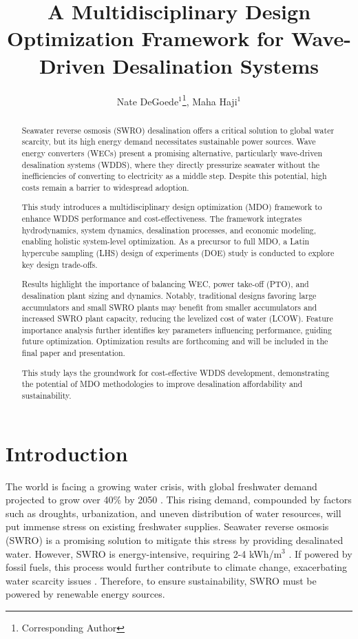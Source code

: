 \documentclass[twocolumn,10pt]{asme2e}
\title{ \vspace{-10 mm} A Multidisciplinary Design Optimization Framework for Wave-Driven Desalination Systems}
\author{Nate DeGoede$^1$\thanks{Corresponding Author}, Maha Haji$^1$
    \affiliation{
	$^1$Sibley School of Mechanical and Aerospace Engineering\\
	Cornell University\\
	Ithaca, New York 14853\\
    Email: \{njd76, maha\}@cornell.edu 
    }
}
\begin{document}
\maketitle

\setlength{\abovedisplayskip}{10pt}
\setlength{\belowdisplayskip}{10pt}

\begin{abstract}

Seawater reverse osmosis (SWRO) desalination offers a critical solution to global water scarcity, but its high energy demand necessitates sustainable power sources. Wave energy converters (WECs) present a promising alternative, particularly wave-driven desalination systems (WDDS), where they directly pressurize seawater without the inefficiencies of converting to electricity as a middle step. Despite this potential, high costs remain a barrier to widespread adoption. 

This study introduces a multidisciplinary design optimization (MDO) framework to enhance WDDS performance and cost-effectiveness. The framework integrates hydrodynamics, system dynamics, desalination processes, and economic modeling, enabling holistic system-level optimization.  As a precursor to full MDO, a Latin hypercube sampling (LHS) design of experiments (DOE) study is conducted to explore key design trade-offs. 

Results highlight the importance of balancing WEC, power take-off (PTO), and desalination plant sizing and dynamics. Notably, traditional designs favoring large accumulators and small SWRO plants may benefit from smaller accumulators and increased SWRO plant capacity, reducing the levelized cost of water (LCOW). Feature importance analysis further identifies key parameters influencing performance, guiding future optimization. Optimization results are forthcoming and will be included in the final paper and presentation.

This study lays the groundwork for cost-effective WDDS development, demonstrating the potential of MDO methodologies to improve desalination affordability and sustainability.

\end{abstract}


\section{Introduction}

The world is facing a growing water crisis, with global freshwater demand projected to grow over 40\% by 2050 \cite{watershortage2015}. This rising demand, compounded by factors such as droughts, urbanization, and uneven distribution of water resources, will put immense stress on existing freshwater supplies. Seawater reverse osmosis (SWRO) is a promising solution to mitigate this stress by providing desalinated water. However, SWRO is energy-intensive, requiring 2-4 kWh/m$^3$ \cite{Li2018}. If powered by fossil fuels, this process would further contribute to climate change, exacerbating water scarcity issues \cite{nytdrought}. Therefore, to ensure sustainability, SWRO must be powered by renewable energy sources. 
\end{document}
